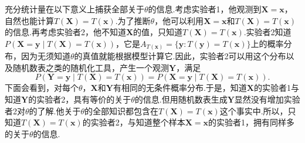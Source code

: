 充分统计量在以下意义上捕获全部关于$\theta$的信息.考虑实验者1，他观测到$\boldsymbol X=\boldsymbol x$，自然也能计算$T(\boldsymbol X)=T(\boldsymbol x)$.为了推断$\theta$，他可以利用$\boldsymbol X=\boldsymbol x$和$T(\boldsymbol X)=T(\boldsymbol x)$的信息.再考虑实验者2，他不知道$\boldsymbol X$的值，只知道$T(\boldsymbol X)=T(\boldsymbol x)$.实验者2知道$P(\boldsymbol X=\boldsymbol y\mid T(\boldsymbol X)=T(\boldsymbol x))$，它是$A_{T(\boldsymbol x)}=\{\boldsymbol y:T(\boldsymbol y)=T(\boldsymbol x)\}$上的概率分布，因为无须知道$\theta$的真值就能根据模型计算它.因此，实验者2可以用这个分布以及随机数表之类的随机化工具，产生一个观测$\boldsymbol Y$，满足
$$P(\boldsymbol Y=\boldsymbol y\mid T(\boldsymbol X)=T(\boldsymbol x))=P(\boldsymbol X=\boldsymbol y\mid T(\boldsymbol X)=T(\boldsymbol x)).$$
下面会看到，对每个$\theta$，$\boldsymbol X$和$\boldsymbol Y$有相同的无条件概率分布.于是，知道$\boldsymbol X$的实验者1与知道$\boldsymbol Y$的实验者2，具有等价的关于$\theta$的信息.但用随机数表生成$\boldsymbol Y$显然没有增加实验者2对$\theta$的了解.他关于$\theta$的全部知识都包含在$T(\boldsymbol X)=T(\boldsymbol x)$这个事实中.所以，只知道$T(\boldsymbol X)=T(\boldsymbol x)$的实验者2，与知道整个样本$\boldsymbol X=\boldsymbol x$的实验者1，拥有同样多的关于$\theta$的信息.

